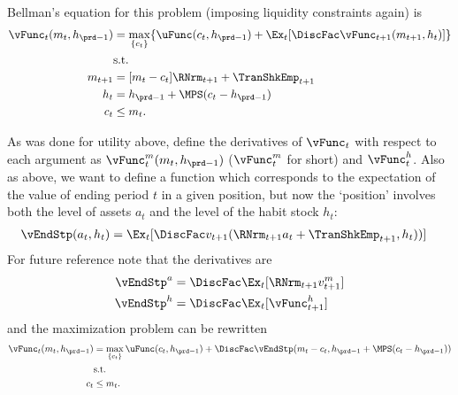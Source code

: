 \documentclass[\econtexRoot/SolvingMicroDSOPs]{subfiles}
\begin{document}
Bellman's equation for this problem (imposing liquidity constraints again) is
\begin{equation}\begin{gathered}\begin{aligned}
  \vFunc_{t}(m_{t},h_{\prd-1})  & = \max_{\{{c}_{t}\}}  \{\uFunc(c_{t},h_{\prd-1}) +
                                   \Ex_{t}[\DiscFac  \vFunc_{t+1}(m_{t+1},h_{t}) ]\}
  \\ & \text{s.t.} \nonumber \\
  m_{t+1}  & = [{m}_{t}-c_{t}]\RNrm_{t+1} + \TranShkEmp_{t+1}\\
  h_{t}  & = h_{\prd-1} + \MPS (c_{t} - h_{\prd-1} ) \\
  c_{t} & \leq  m_{t} .
\end{aligned}\end{gathered}\end{equation}

As was done for utility above, define the derivatives of $\vFunc_{t}$ with
respect to each argument as $\vFunc_{t}^{m}(m_{t},h_{\prd-1})$ ($\vFunc_{t}^{m}$
for short) and $\vFunc_{t}^{h}$.  Also as above, we want to
define a function which corresponds to the expectation of the value of
ending period $t$ in a given position, but now the `position'
involves both the level of assets $a_{t}$ and the level of the habit
stock $h_{t}$:
\begin{equation}\begin{gathered}\begin{aligned}
  \vEndStp(a_{t},h_{t})  & = \Ex_{t}[\DiscFac v_{t+1}(\RNrm_{t+1} a_{t}+{\TranShkEmp}_{t+1},h_{t}))]
\end{aligned}\end{gathered}\end{equation}
For future reference note that the derivatives are
\begin{equation}\begin{gathered}\begin{aligned}
  \vEndStp^a  & = \DiscFac \Ex_{t} [\RNrm_{t+1} v_{t+1}^{m}] \label{eq:vEndsdefn} \\
  \vEndStp^{h}  & = \DiscFac \Ex_{t} [{\vFunc}_{t+1}^{h}] 
\end{aligned}\end{gathered}\end{equation}
and the maximization problem can be rewritten
\begin{equation}\begin{gathered}\begin{aligned}
  \vFunc_{t}(m_{t},h_{\prd-1})
  & =                                         \max_{\{{c}_{t}\}} %
    \uFunc(c_{t},h_{\prd-1})  +  \DiscFac
    \vEndStp(m_{t}-c_{t},h_{\prd-1}+\MPS(c_{t}-h_{\prd-1}))
  \\        & \text{s.t.} \nonumber
  \\  c_{t} & \leq  m_{t}.
\end{aligned}\end{gathered}\end{equation}
\end{document}
